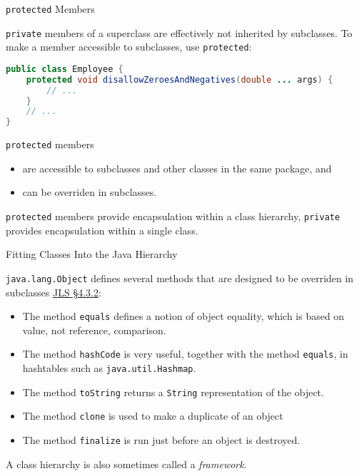\documentclass{beamer}
\begin{document}
\begin{frame}[fragile]{{\tt protected} Members}


{\tt private} members of a superclass are effectively not inherited by subclasses.  To make a member accessible to subclasses, use {\tt protected}:
\begin{lstlisting}[language=Java]
public class Employee {
    protected void disallowZeroesAndNegatives(double ... args) {
        // ...
    }
    // ...
}
\end{lstlisting}
{\tt protected} members
\begin{itemize}
\item are accessible to subclasses and other classes in the same package, and
\item can be overriden in subclasses.
\end{itemize}
{\tt protected} members provide encapsulation within a class hierarchy, {\tt private} provides encapsulation within a single class.

\end{frame}

\begin{frame}[fragile]{Fitting Classes Into the Java Hierarchy}


{\tt java.lang.Object} defines several methods that are designed to be overriden in subclasses \href{http://docs.oracle.com/javase/specs/jls/se7/html/jls-4.html#jls-4.3.2}{JLS \S 4.3.2}: 
\begin{itemize}
\item The method {\tt equals} defines a notion of object equality, which is based on value, not reference, comparison.
\item The method {\tt hashCode} is very useful, together with the method {\tt equals}, in hashtables such as {\tt java.util.Hashmap}.
\item The method {\tt toString} returns a {\tt String} representation of the object.
\item The method {\tt clone} is used to make a duplicate of an object
\item The method {\tt finalize} is run just before an object is destroyed.
\end{itemize}

A class hierarchy is also sometimes called a {\it framework}.

\end{frame}
\end{document}
